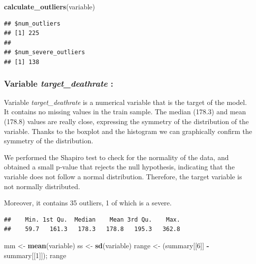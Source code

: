 \documentclass[
]{article}
\newenvironment{Shaded}{\begin{snugshade}}{\end{snugshade}}
\newcommand{\DecValTok}[1]{\textcolor[rgb]{0.00,0.00,0.81}{#1}}
\newcommand{\FunctionTok}[1]{\textcolor[rgb]{0.13,0.29,0.53}{\textbf{#1}}}
\newcommand{\NormalTok}[1]{#1}
\newcommand{\OtherTok}[1]{\textcolor[rgb]{0.56,0.35,0.01}{#1}}
\newcommand{\SpecialCharTok}[1]{\textcolor[rgb]{0.81,0.36,0.00}{\textbf{#1}}}
\begin{document}
\begin{Shaded}
\begin{Highlighting}[]
\FunctionTok{calculate\_outliers}\NormalTok{(variable)}
\end{Highlighting}
\end{Shaded}

\begin{verbatim}
## $num_outliers
## [1] 225
## 
## $num_severe_outliers
## [1] 138
\end{verbatim}

\subsubsection{\texorpdfstring{Variable \emph{target\_deathrate}
:}{Variable target\_deathrate :}}\label{variable-target_deathrate}

Variable \emph{target\_deathrate} is a numerical variable that is the
target of the model. It contains no missing values in the train sample.
The median (178.3) and mean (178.8) values are really close, expressing
the symmetry of the distribution of the variable. Thanks to the boxplot
and the histogram we can graphically confirm the symmetry of the
distribution.

We performed the Shapiro test to check for the normality of the data,
and obtained a small p-value that rejects the null hypothesis,
indicating that the variable does not follow a normal distribution.
Therefore, the target variable is not normally distributed.

Moreover, it contains 35 outliers, 1 of which is a severe.

\begin{Shaded}
\end{Shaded}

\begin{verbatim}
##    Min. 1st Qu.  Median    Mean 3rd Qu.    Max. 
##    59.7   161.3   178.3   178.8   195.3   362.8
\end{verbatim}

\begin{Shaded}
\begin{Highlighting}[]
\NormalTok{mm }\OtherTok{\textless{}{-}} \FunctionTok{mean}\NormalTok{(variable)}
\NormalTok{ss }\OtherTok{\textless{}{-}} \FunctionTok{sd}\NormalTok{(variable)}
\NormalTok{range }\OtherTok{\textless{}{-}}\NormalTok{ (summary[[}\DecValTok{6}\NormalTok{]] }\SpecialCharTok{{-}}\NormalTok{ summary[[}\DecValTok{1}\NormalTok{]]); range}
\end{Highlighting}
\end{Shaded}
\end{document}
